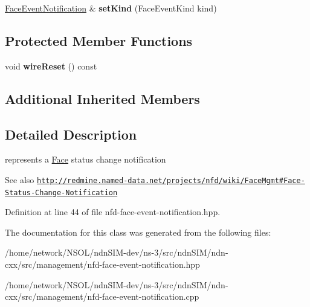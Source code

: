 \begin{DoxyCompactItemize}
\item 
\hyperlink{classndn_1_1nfd_1_1FaceEventNotification}{Face\+Event\+Notification} \& {\bfseries set\+Kind} (Face\+Event\+Kind kind)\hypertarget{classndn_1_1nfd_1_1FaceEventNotification_a42c2caee5df67dd2e8b9980865a50748}{}\label{classndn_1_1nfd_1_1FaceEventNotification_a42c2caee5df67dd2e8b9980865a50748}

\end{DoxyCompactItemize}
\subsection*{Protected Member Functions}
\begin{DoxyCompactItemize}
\item 
void {\bfseries wire\+Reset} () const\hypertarget{classndn_1_1nfd_1_1FaceEventNotification_ae49f5851f3b1153a4dad6c4e25bde1d7}{}\label{classndn_1_1nfd_1_1FaceEventNotification_ae49f5851f3b1153a4dad6c4e25bde1d7}

\end{DoxyCompactItemize}
\subsection*{Additional Inherited Members}


\subsection{Detailed Description}
represents a \hyperlink{classndn_1_1Face}{Face} status change notification 

\begin{DoxySeeAlso}{See also}
\href{http://redmine.named-data.net/projects/nfd/wiki/FaceMgmt#Face-Status-Change-Notification}{\tt http\+://redmine.\+named-\/data.\+net/projects/nfd/wiki/\+Face\+Mgmt\#\+Face-\/\+Status-\/\+Change-\/\+Notification} 
\end{DoxySeeAlso}


Definition at line 44 of file nfd-\/face-\/event-\/notification.\+hpp.



The documentation for this class was generated from the following files\+:\begin{DoxyCompactItemize}
\item 
/home/network/\+N\+S\+O\+L/ndn\+S\+I\+M-\/dev/ns-\/3/src/ndn\+S\+I\+M/ndn-\/cxx/src/management/nfd-\/face-\/event-\/notification.\+hpp\item 
/home/network/\+N\+S\+O\+L/ndn\+S\+I\+M-\/dev/ns-\/3/src/ndn\+S\+I\+M/ndn-\/cxx/src/management/nfd-\/face-\/event-\/notification.\+cpp\end{DoxyCompactItemize}
